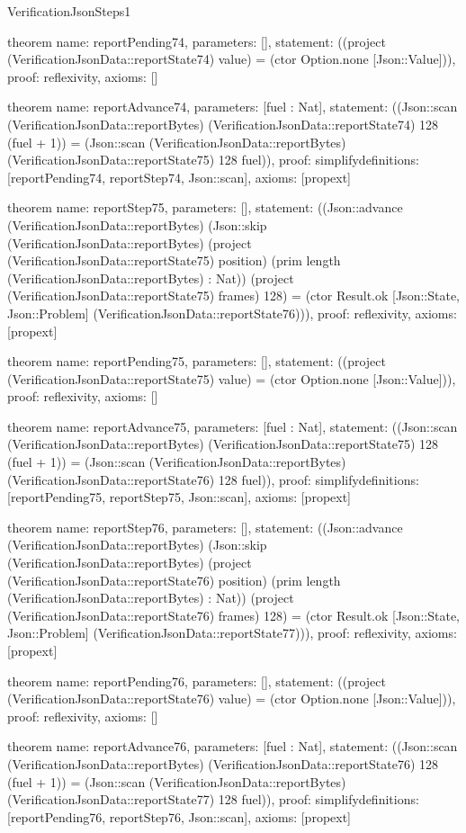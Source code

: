 \begin{lexlean}{VerificationJsonSteps1}
\begin{semanticmodule}
theorem{
  name: reportPending74,
  parameters: [],
  statement: ((project (VerificationJsonData::reportState74) value) = (ctor Option.none [Json::Value])),
  proof: reflexivity{},
  axioms: []
}

theorem{
  name: reportAdvance74,
  parameters: [fuel : Nat],
  statement: ((Json::scan (VerificationJsonData::reportBytes) (VerificationJsonData::reportState74) 128 (fuel + 1)) = (Json::scan (VerificationJsonData::reportBytes) (VerificationJsonData::reportState75) 128 fuel)),
  proof: simplify{definitions: [reportPending74, reportStep74, Json::scan]},
  axioms: [propext]
}

theorem{
  name: reportStep75,
  parameters: [],
  statement: ((Json::advance (VerificationJsonData::reportBytes) (Json::skip (VerificationJsonData::reportBytes) (project (VerificationJsonData::reportState75) position) (prim length (VerificationJsonData::reportBytes) : Nat)) (project (VerificationJsonData::reportState75) frames) 128) = (ctor Result.ok [Json::State, Json::Problem] (VerificationJsonData::reportState76))),
  proof: reflexivity{},
  axioms: [propext]
}

theorem{
  name: reportPending75,
  parameters: [],
  statement: ((project (VerificationJsonData::reportState75) value) = (ctor Option.none [Json::Value])),
  proof: reflexivity{},
  axioms: []
}

theorem{
  name: reportAdvance75,
  parameters: [fuel : Nat],
  statement: ((Json::scan (VerificationJsonData::reportBytes) (VerificationJsonData::reportState75) 128 (fuel + 1)) = (Json::scan (VerificationJsonData::reportBytes) (VerificationJsonData::reportState76) 128 fuel)),
  proof: simplify{definitions: [reportPending75, reportStep75, Json::scan]},
  axioms: [propext]
}

theorem{
  name: reportStep76,
  parameters: [],
  statement: ((Json::advance (VerificationJsonData::reportBytes) (Json::skip (VerificationJsonData::reportBytes) (project (VerificationJsonData::reportState76) position) (prim length (VerificationJsonData::reportBytes) : Nat)) (project (VerificationJsonData::reportState76) frames) 128) = (ctor Result.ok [Json::State, Json::Problem] (VerificationJsonData::reportState77))),
  proof: reflexivity{},
  axioms: [propext]
}

theorem{
  name: reportPending76,
  parameters: [],
  statement: ((project (VerificationJsonData::reportState76) value) = (ctor Option.none [Json::Value])),
  proof: reflexivity{},
  axioms: []
}

theorem{
  name: reportAdvance76,
  parameters: [fuel : Nat],
  statement: ((Json::scan (VerificationJsonData::reportBytes) (VerificationJsonData::reportState76) 128 (fuel + 1)) = (Json::scan (VerificationJsonData::reportBytes) (VerificationJsonData::reportState77) 128 fuel)),
  proof: simplify{definitions: [reportPending76, reportStep76, Json::scan]},
  axioms: [propext]
}


\end{semanticmodule}
\end{lexlean}
